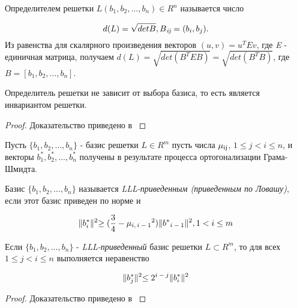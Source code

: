   \begin{definition}
   Определителем решетки {$L(b_1,b_2, \dots, b_n) \in R^n$} называется число
   
   \begin{equation}
    \textit{{$d(L) = \sqrt{detB}, B\textsubscript{ij} = (b_i, b_j)$}}.
   \end{equation}
   Из равенства для скалярного произведения векторов {$(u, v) = u^T E v$}, где \textit{E} - единичная матрица, получаем 
   \textit{{$d(L) = \sqrt{det(B^TEB)} = \sqrt{det(B^TB)}$}}, где {$B = [b_1,b_2, \dots, b_n]$}.
  \end{definition}
  
  \begin{theorem}
   Определитель решетки не зависит от выбора базиса, то есть является инвариантом решетки.
   
   \begin{proof}
    Доказательство приведено в \cite[Глава 8.2, страница 261]{mah06}
  \end{proof}
  \end{theorem}  
  
  Пусть {$\{ b_1, b_2, \dots, b_n \}$} - базис решетки {$L \in R^m$}  пусть числа {$\mu\textsubscript{ij}$}, {$1 \le j < i \le n$}, и векторы
  {$b_1^*, b_2^*, \dots, b_n^*$} получены в результате процесса ортогонализации Грама-Шмидта.
  
  \begin{definition}
   Базис {$\{b_1, b_2, \dots, b_n\}$} называется \textit{LLL-приведенным (приведенным по Ловашу)}, если этот базис приведен по норме и
   
   \begin{equation}
      \textit{{$\lVert b_i^* \lVert^2 \ge (\frac{3}{4} - \mu\textsubscript{{$i,i-1$}}^2)\lVert b^*\textsubscript{{$i-1$}} \lVert^2, 1<i \le m $}}
   \end{equation}

  \end{definition}
  
  \begin{lemma}
   Если {$\{b_1, b_2, \dots, b_n\}$} - \textit{LLL-приведенный} базис решетки {$L \subset R^m$}, то для всех {$1 \le j < i \le n$} выполняется неравенство
   
   \begin{equation}
    \textit{{$ \lVert b_j^* \lVert^2 \le 2\textsuperscript{{$i-j$}} \lVert b_i^* \lVert^2 $}}
   \end{equation}
   \begin{proof}
      Доказательство приведено в \cite[Глава 8.2, страница 265]{mah06}
   \end{proof}   
  \end{lemma}
  
